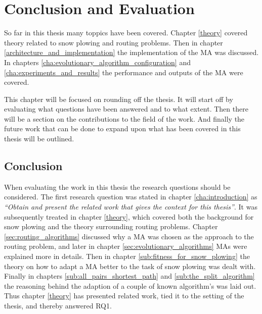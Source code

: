 \chapter{Conclusion and Evaluation}

So far in this thesis many toppics have been covered. Chapter \ref{theory} covered theory related to snow plowing and routing problems. Then in chapter \ref{architecture_and_implementation} the implementation of the MA was discussed. In chapters \ref{cha:evolutionary_algorithm_configuration} and \ref{cha:experiments_and_results} the performance and outputs of the MA were covered.

This chapter will be focused on rounding off the thesis. It will start off by evaluating what questions have been answered and to what extent. Then there will be a section on the contributions to the field of the work. And finally the future work that can be done to expand upon what has been covered in this thesis will be outlined.

\section{Conclusion}

When evaluating the work in this thesis the research questions should be considered. The first research question was stated in chapter \ref{cha:introduction} as \emph{\enquote{Obtain and present the related work that gives the context for this thesis}}. It was subsequently treated in chapter \ref{theory}, which covered both the background for snow plowing and the theory surrounding routing problems. Chapter \ref{sec:routing_algorithms} discussed why a MA was chosen as the approach to the routing problem, and later in chapter \ref{sec:evolutionary_algorithms} MAs were explained more in details. Then in chapter \ref{sub:fitness_for_snow_plowing} the theory on how to adapt a MA better to the task of snow plowing was dealt with. Finally in chapters \ref{sub:all_pairs_shortest_path} and \ref{sub:the_split_algorithm} the reasoning behind the adaption of a couple of known algorithm's was laid out. Thus chapter \ref{theory} has presented related work, tied it to the setting of the thesis, and thereby answered RQ1.

